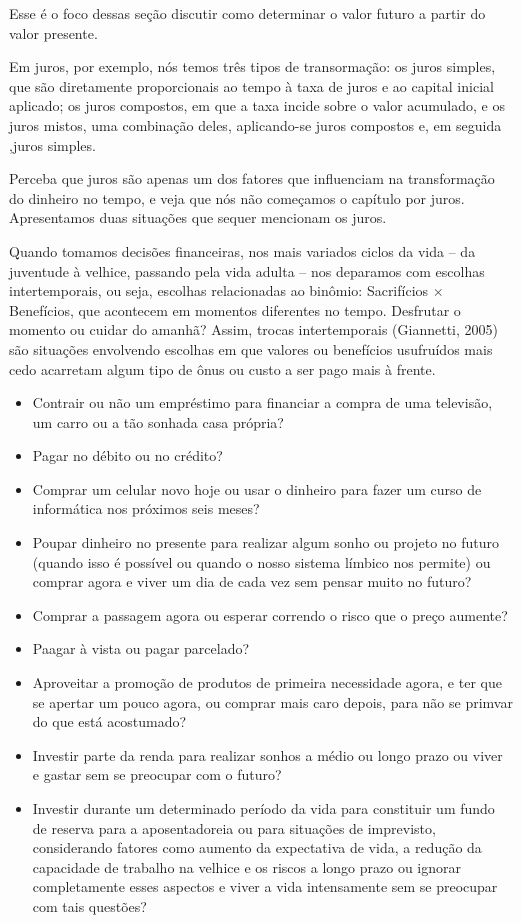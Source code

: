 \begin{paginatexto2}
Esse é o foco dessas seção discutir como determinar o valor futuro a partir do valor presente.

Em juros, por exemplo, nós temos três tipos de transormação: os juros simples, que são diretamente proporcionais ao tempo à taxa de juros e ao capital inicial aplicado; os juros compostos, em que a taxa incide sobre o valor acumulado, e os juros mistos, uma combinação deles, aplicando-se juros compostos e, em seguida ,juros simples.

Perceba que juros são apenas um dos fatores que influenciam na transformação do dinheiro no tempo, e veja que nós não começamos o capítulo por juros. Apresentamos duas situações que sequer mencionam os juros.
\end{paginatexto2}



Quando tomamos decisões financeiras, nos mais variados ciclos da vida – da juventude à velhice, passando pela vida adulta – nos deparamos com escolhas intertemporais, ou seja, escolhas relacionadas ao binômio: Sacrifícios $\times$ Benefícios, que acontecem em momentos diferentes no tempo. Desfrutar o momento ou cuidar do amanhã? Assim, trocas intertemporais (Giannetti, 2005) são situações envolvendo escolhas em que valores ou benefícios usufruídos mais cedo acarretam algum tipo de ônus ou custo a ser pago mais à frente.

\begin{itemize}
  \item Contrair ou não um empréstimo para financiar a compra de uma televisão, um carro ou a tão sonhada casa própria?
  \item Pagar no débito ou no crédito?
  \item Comprar um celular novo hoje ou usar o dinheiro para fazer um curso de informática nos próximos seis meses?
  \item Poupar dinheiro no presente para realizar algum sonho ou projeto no futuro (quando isso é possível ou quando o nosso sistema límbico nos permite) ou comprar agora e viver um dia de cada vez sem pensar muito no futuro?
  \item Comprar a passagem agora ou esperar correndo o risco que o preço aumente?
  \item Paagar à vista ou pagar parcelado?
  \item Aproveitar a promoção de produtos de primeira necessidade agora, e ter que se apertar um pouco agora, ou comprar mais caro depois, para não se primvar do que está acostumado?
  \item Investir parte da renda para realizar sonhos a médio ou longo prazo ou viver e gastar sem se preocupar com o futuro?
  \item Investir durante um determinado período da vida para constituir um fundo de reserva para a aposentadoreia ou para situações de imprevisto, considerando fatores como aumento da expectativa de vida, a redução da capacidade de trabalho na velhice e os riscos a longo prazo ou ignorar completamente esses aspectos e viver a vida intensamente sem se preocupar com tais questões?
\end{itemize}

